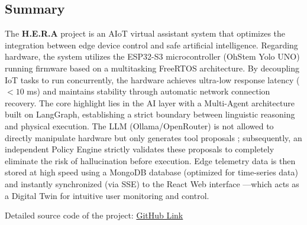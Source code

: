 \subsection{Summary}
The \textbf{H.E.R.A} project is an AIoT virtual assistant system that optimizes the integration between edge device control and safe artificial intelligence. Regarding hardware, the system utilizes the ESP32-S3 microcontroller (OhStem Yolo UNO) running firmware based on a multitasking FreeRTOS architecture. By decoupling IoT tasks to run concurrently, the hardware achieves ultra-low response latency ($<10$ ms) and maintains stability through automatic network connection recovery. The core highlight lies in the AI layer with a Multi-Agent architecture built on LangGraph, establishing a strict boundary between linguistic reasoning and physical execution. The LLM (Ollama/OpenRouter) is not allowed to directly manipulate hardware but only generates tool proposals ; subsequently, an independent Policy Engine strictly validates these proposals to completely eliminate the risk of hallucination before execution. Edge telemetry data is then stored at high speed using a MongoDB database (optimized for time-series data)  and instantly synchronized (via SSE) to the React Web interface ---which acts as a Digital Twin for intuitive user monitoring and control.

Detailed source code of the project: \href{https://github.com/TienHwng/MP-AI-252.git}{GitHub Link} 